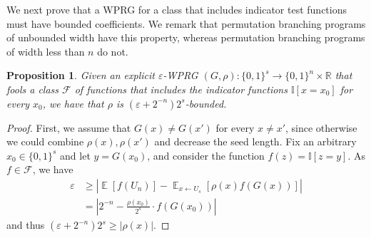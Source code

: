 \documentclass[11pt]{article}
\numberwithin{equation}{section}
\newtheorem{proposition}[theorem]{Proposition}
\theoremstyle{definition}
\theoremstyle{plain}
\newcommand{\R}{\mathbb R}
\newcommand{\eps}{\varepsilon}
\newcommand{\zo}{\{0,1\}}
\newcommand{\la}{\leftarrow}
\newcommand{\ra}{\rightarrow}
\newcommand{\cF}{\mathcal{F}}
\DeclareMathOperator*{\E}{\mathbb{E}}
\begin{document}
We next prove that a WPRG for a class that includes indicator test functions must have bounded coefficients. We remark that permutation branching programs %
of  %
unbounded width have this property, whereas permutation branching programs of width less
than $n$ do not. 
\begin{proposition}
  Given an explicit $\eps$-WPRG $(G,\rho):\zo^s\ra\zo^n\times \R$ that fools a
%
class $\cF$ of functions   %
that includes the indicator functions $\mathbb{I}[x=x_0]$ for every $x_0$, we have that $\rho$ is $(\eps+2^{-n})2^{s}$-bounded.
\end{proposition}
\begin{proof}
    First, we assume that $G(x)\neq G(x')$ for every $x\neq x'$, since otherwise we could combine $\rho(x),\rho(x')$ and decrease the seed length. Fix an arbitrary $x_0\in \zo^s$ and let $y=G(x_0)$, and consider the function $f(z)=\mathbb{I}[z=y]$. As $f\in \cF$, we have
    \begin{align*}
        \eps &\geq \left|\E[f(U_n)] - \E_{x\la U_s}[\rho(x)f(G(x))] \right|\\
        &= \left|2^{-n}-\frac{\rho(x_0)}{2^s}\cdot %
        f(G(x_0))\right|
    \end{align*}
    and thus $(\eps+2^{-n})2^s\geq |\rho(x)|$.
\end{proof}
\end{document}
